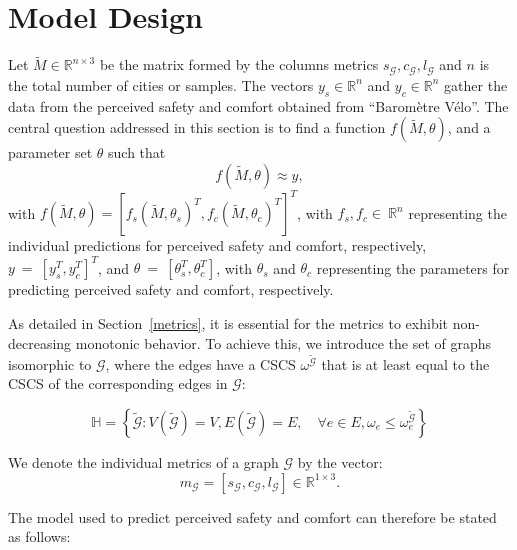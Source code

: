 \documentclass[lettersize,journal]{IEEEtran}
\begin{document}
\section{Model Design}
\label{parameters_estimation}

Let $\tilde{M} \in \mathbb{R}^{n \times 3}$ be the matrix formed by the columns metrics $s_{\mathcal{G}}, c_{\mathcal{G}}, l_{\mathcal{G}}$ and $n$ is the total number of cities or samples.
The vectors $y_{s} \in \mathbb{R}^{n}$ and $y_{c} \in \mathbb{R}^{n}$ gather the data from the perceived safety and comfort obtained from ``Baromètre Vélo''. The central question addressed in this section is to find a function $f(\tilde{M}, \theta)$, and a parameter set $\theta$  such that
\begin{equation}
    \label{approach_function}
    f(\tilde{M}, \theta) \approx  y,
\end{equation}
with $f(\tilde{M}, \theta)=[f_{s}(\tilde{M}, \theta_s)^T, f_{c}(\tilde{M}, \theta_c)^T]^T$, with $f_{s}, f_{c} \in~\mathbb{R}^{n}$ representing the individual predictions for perceived safety and comfort, respectively, $y~=~[y_{s}^{T}, y_{c}^{T}]^{T}$, and $\theta~=~[\theta_{s}^T, \theta_{c}^T]$, with $\theta_{s}$ and $\theta_{c}$ representing the parameters for predicting perceived safety and comfort, respectively.

As detailed in Section~\ref{metrics}, it is essential for the metrics to exhibit non-decreasing monotonic behavior. To achieve this, we introduce the set of graphs isomorphic to $\mathcal{G}$, where the edges have a CSCS $\omega^{\tilde{\mathcal{G}}}$ that is at least equal to the CSCS of the corresponding edges in $\mathcal{G}$:

$$
\mathbb{H} = \left\{ \tilde{\mathcal{G}}: V(\tilde{\mathcal{G}}) = V,  E(\tilde{\mathcal{G}}) = E,  \quad \forall e \in E, \omega_e \leq \omega_e^{\tilde{\mathcal{G}}} \right\}
$$

We denote the individual metrics of a graph $\mathcal{G}$ by the vector:
\begin{equation} \nonumber
    m_{\mathcal{G}} = \left [ s_{\mathcal{G}}, c_{\mathcal{G}}, l_{\mathcal{G}} \right ] \in \mathbb{R}^{1 \times 3}.
\end{equation}

The model used to predict perceived safety and comfort can therefore be stated as follows:
\end{document}

